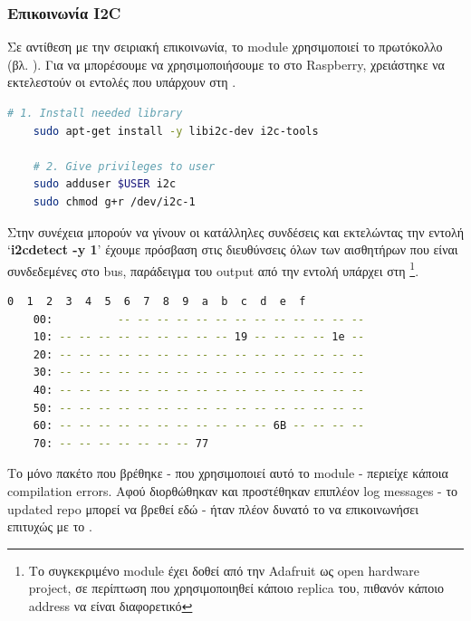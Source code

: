 \subsubsection{Επικοινωνία I2C}
Σε αντίθεση με την σειριακή επικοινωνία, το  module χρησιμοποιεί το  πρωτόκολλο (βλ. ).
Για να μπορέσουμε να χρησιμοποιήσουμε το  στο Raspberry, χρειάστηκε να εκτελεστούν οι εντολές που υπάρχουν στη .

\begin{lstlisting}[language=bash, escapechar=@, caption={Fix I2C communication},label=list:fix-I2C-communication]
    # 1. Install needed library
    sudo apt-get install -y libi2c-dev i2c-tools 

    # 2. Give privileges to user
    sudo adduser $USER i2c
    sudo chmod g+r /dev/i2c-1
\end{lstlisting}

Στην συνέχεια μπορούν να γίνουν οι κατάλληλες συνδέσεις και εκτελώντας την ε\-ντο\-λή `\textbf{i2cdetect -y 1}' έχουμε πρόσβαση στις διευθύνσεις όλων των αισθητήρων που είναι συνδεδεμένες στο  bus, παράδειγμα του output από την εντολή υπάρχει στη \footnote{Το συγκεκριμένο module έχει δοθεί από την Adafruit ως open hardware project, σε περίπτωση που χρησιμοποιηθεί κάποιο replica του, πιθανόν κάποιο address να είναι διαφορετικό}.

\begin{lstlisting}[language=bash, escapechar=@, caption={I2C addressed output example},label=list:I2C-output]
    0  1  2  3  4  5  6  7  8  9  a  b  c  d  e  f
    00:          -- -- -- -- -- -- -- -- -- -- -- -- -- 
    10: -- -- -- -- -- -- -- -- -- 19 -- -- -- -- 1e -- 
    20: -- -- -- -- -- -- -- -- -- -- -- -- -- -- -- -- 
    30: -- -- -- -- -- -- -- -- -- -- -- -- -- -- -- -- 
    40: -- -- -- -- -- -- -- -- -- -- -- -- -- -- -- -- 
    50: -- -- -- -- -- -- -- -- -- -- -- -- -- -- -- -- 
    60: -- -- -- -- -- -- -- -- -- -- -- 6B -- -- -- -- 
    70: -- -- -- -- -- -- -- 77       
\end{lstlisting}

Το μόνο  πακέτο που βρέθηκε \cite{ros-adafruit-10dof-imu-original} - που χρησιμοποιεί αυτό το module - περιείχε κάποια compilation errors. Αφού διορθώθηκαν και προστέθηκαν επιπλέον log messages - το updated repo μπορεί να βρεθεί εδώ \cite{ros-adafruit-10dof-imu-cspyridakis} - ήταν πλέον δυνατό το  να επικοινωνήσει επιτυχώς με το .

